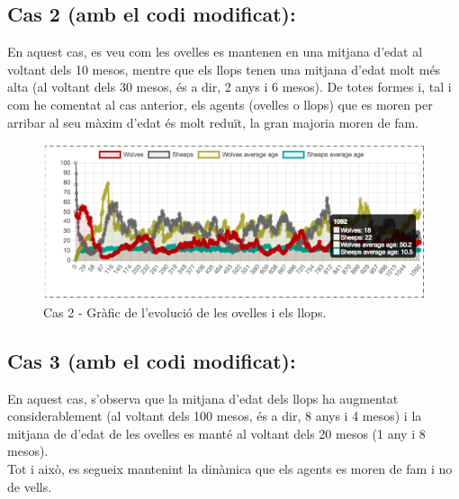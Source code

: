 \documentclass{article} %
\begin{document}
{	\subsection*{Cas 2 (amb el codi modificat):}

	En aquest cas, es veu com les ovelles es mantenen en una mitjana d'edat al voltant dels 10 mesos, mentre que els llops tenen una mitjana d'edat molt més alta (al voltant dels 30 mesos, és a dir, 2 anys i 6 mesos). De totes formes i, tal i com he comentat al cas anterior, els agents (ovelles o llops) que es moren per arribar al seu màxim d'edat és molt reduït, la gran majoria moren de fam. \\

	\begin{figure}[H]
		\begin{changemargin}{-1cm}{0.5cm}
			\includegraphics[width=14cm]{mod_case_2_graph}
			\centering
			\color{blue}
			\caption{Cas 2 - Gràfic de l'evolució de les ovelles i els llops.}\label{visina8}
		\end{changemargin}
	\end{figure}

	\subsection*{Cas 3 (amb el codi modificat):}

	En aquest cas, s'observa que la mitjana d'edat dels llops ha augmentat considerablement (al voltant dels 100 mesos, és a dir, 8 anys i 4 mesos) i la mitjana de d'edat de les ovelles es manté al voltant dels 20 mesos (1 any i 8 mesos). \\

	Tot i això, es segueix mantenint la dinàmica que els agents es moren de fam i no de vells. \\

}
\end{document}
